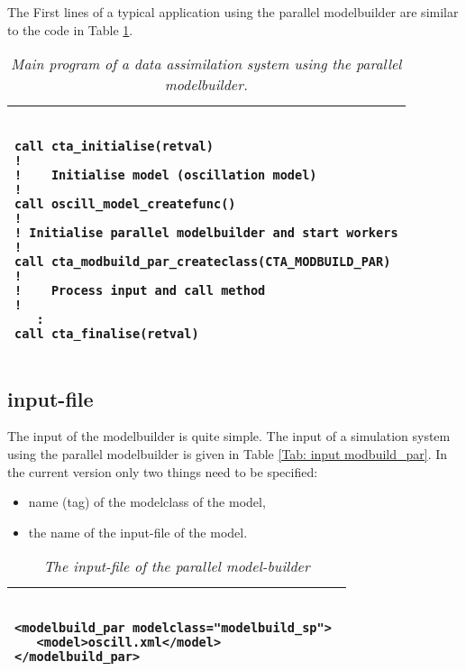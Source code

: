 \documentclass[a4paper,12pt]{article}
\begin{document}
The First lines of a typical application using the parallel modelbuilder
are similar to the code in Table \ref{Tab: main program}.


\begin{table}[h]
\begin{tabular}{|l|}
\hline
\begin{minipage}{16cm}
\begin{verbatim}

call cta_initialise(retval)
!
!    Initialise model (oscillation model)
!
call oscill_model_createfunc()
!
! Initialise parallel modelbuilder and start workers
!
call cta_modbuild_par_createclass(CTA_MODBUILD_PAR)
!
!    Process input and call method
!     
   :
call cta_finalise(retval)

\end{verbatim}
\end{minipage}
\\
\hline
\end{tabular}
\caption{\em Main program of a data assimilation system using the parallel
modelbuilder.}
\label{Tab: main program}
\end{table}


\subsection{input-file} \label{Sec:input-file}
The input of the modelbuilder is quite simple. The input of a simulation
system using the parallel modelbuilder is given in Table \ref{Tab: input
modbuild_par}. In the current version only two things need to
be specified:
\begin{itemize}
\item name (tag) of the modelclass of the model,
\item the name of the input-file of the model.
\end{itemize}


\begin{table}[h]
\begin{tabular}{|l|}
\hline
\begin{minipage}{16cm}
\begin{verbatim}

<modelbuild_par modelclass="modelbuild_sp"> 
   <model>oscill.xml</model>
</modelbuild_par> 

\end{verbatim}
\end{minipage}
\\
\hline
\end{tabular}
\caption{\em The input-file of the parallel model-builder}
\label{Tab: input modbuild_par}
\end{table}
\end{document}
